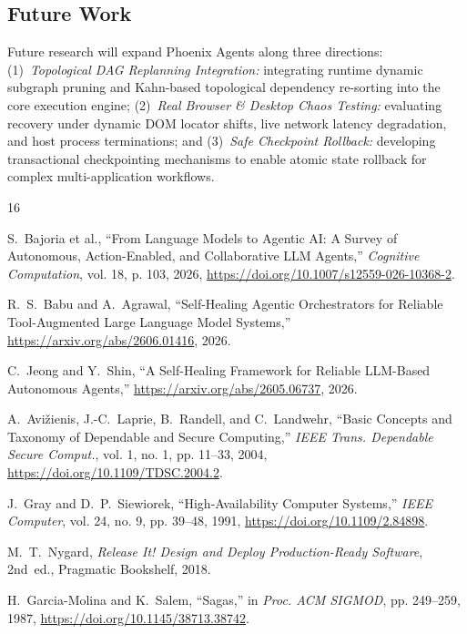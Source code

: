 \documentclass[conference]{IEEEtran}
\begin{document}
\subsection{Future Work}
Future research will expand Phoenix Agents along three directions: (1)~\textit{Topological DAG Replanning Integration:} integrating runtime dynamic subgraph pruning and Kahn-based topological dependency re-sorting into the core execution engine; (2)~\textit{Real Browser \& Desktop Chaos Testing:} evaluating recovery under dynamic DOM locator shifts, live network latency degradation, and host process terminations; and (3)~\textit{Safe Checkpoint Rollback:} developing transactional checkpointing mechanisms to enable atomic state rollback for complex multi-application workflows.

\begin{thebibliography}{16}
\footnotesize
\def\UrlFont{\tiny\rmfamily}
\setlength{\itemsep}{0pt plus 0.2pt}
\setlength{\parsep}{0pt}
\setlength{\parskip}{0pt}

S.~Bajoria et al., ``From Language Models to Agentic AI: A Survey of Autonomous, Action-Enabled, and Collaborative LLM Agents,'' \emph{Cognitive Computation}, vol. 18, p. 103, 2026, \url{https://doi.org/10.1007/s12559-026-10368-2}.

R.~S.~Babu and A.~Agrawal, ``Self-Healing Agentic Orchestrators for Reliable Tool-Augmented Large Language Model Systems,'' \url{https://arxiv.org/abs/2606.01416}, 2026.

C.~Jeong and Y.~Shin, ``A Self-Healing Framework for Reliable LLM-Based Autonomous Agents,'' \url{https://arxiv.org/abs/2605.06737}, 2026.

A.~Avi\v{z}ienis, J.-C.~Laprie, B.~Randell, and C.~Landwehr, ``Basic Concepts and Taxonomy of Dependable and Secure Computing,'' \emph{IEEE Trans. Dependable Secure Comput.}, vol. 1, no. 1, pp. 11--33, 2004, \url{https://doi.org/10.1109/TDSC.2004.2}.

J.~Gray and D.~P.~Siewiorek, ``High-Availability Computer Systems,'' \emph{IEEE Computer}, vol. 24, no. 9, pp. 39--48, 1991, \url{https://doi.org/10.1109/2.84898}.

M.~T.~Nygard, \emph{Release It! Design and Deploy Production-Ready Software}, 2nd~ed., Pragmatic Bookshelf, 2018.

H.~Garcia-Molina and K.~Salem, ``Sagas,'' in \emph{Proc. ACM SIGMOD}, pp. 249--259, 1987, \url{https://doi.org/10.1145/38713.38742}.


\end{thebibliography}
\end{document}

